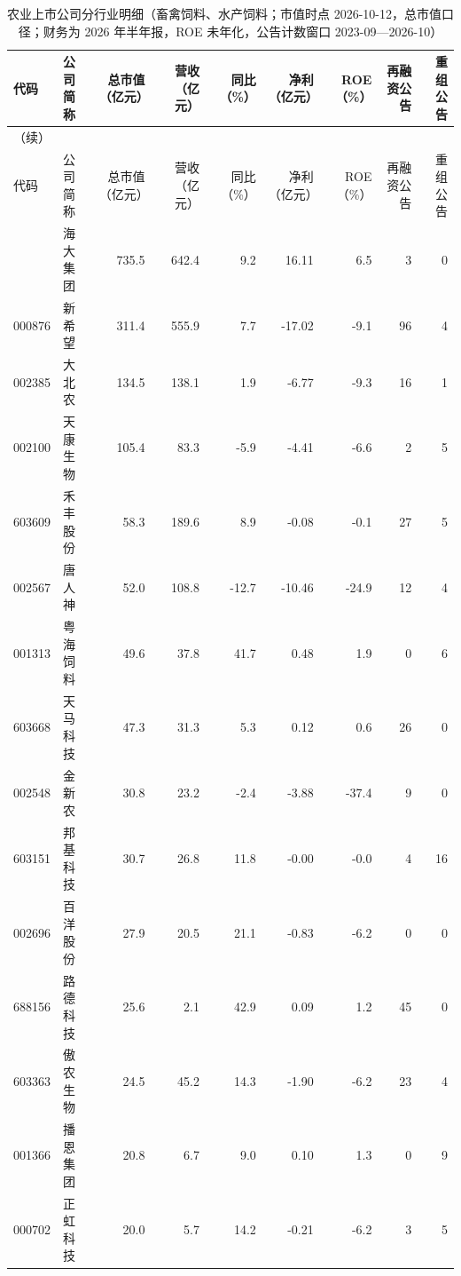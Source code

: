 \begingroup\scriptsize\setlength{\tabcolsep}{2pt}
\begin{longtable}{@{}llrrrrrrr@{}}
\caption{农业上市公司分行业明细（畜禽饲料、水产饲料；市值时点 2026-10-12，总市值口径；财务为 2026 年半年报，ROE 未年化，公告计数窗口 2023-09---2026-10）}\label{tab:comp-feed}\\
\toprule
代码 & 公司简称 & 总市值（亿元） & 营收（亿元） & 同比（\%） & 净利（亿元） & ROE（\%） & 再融资公告 & 重组公告 \\
\midrule
\endfirsthead
\multicolumn{9}{l}{\small（续）}\\
\toprule
代码 & 公司简称 & 总市值（亿元） & 营收（亿元） & 同比（\%） & 净利（亿元） & ROE（\%） & 再融资公告 & 重组公告 \\
\midrule
\endhead
\bottomrule
\endlastfoot
002311 & 海大集团 & 735.5 & 642.4 & 9.2 & 16.11 & 6.5 & 3 & 0 \\
000876 & 新希望 & 311.4 & 555.9 & 7.7 & -17.02 & -9.1 & 96 & 4 \\
002385 & 大北农 & 134.5 & 138.1 & 1.9 & -6.77 & -9.3 & 16 & 1 \\
002100 & 天康生物 & 105.4 & 83.3 & -5.9 & -4.41 & -6.6 & 2 & 5 \\
603609 & 禾丰股份 & 58.3 & 189.6 & 8.9 & -0.08 & -0.1 & 27 & 5 \\
002567 & 唐人神 & 52.0 & 108.8 & -12.7 & -10.46 & -24.9 & 12 & 4 \\
001313 & 粤海饲料 & 49.6 & 37.8 & 41.7 & 0.48 & 1.9 & 0 & 6 \\
603668 & 天马科技 & 47.3 & 31.3 & 5.3 & 0.12 & 0.6 & 26 & 0 \\
002548 & 金新农 & 30.8 & 23.2 & -2.4 & -3.88 & -37.4 & 9 & 0 \\
603151 & 邦基科技 & 30.7 & 26.8 & 11.8 & -0.00 & -0.0 & 4 & 16 \\
002696 & 百洋股份 & 27.9 & 20.5 & 21.1 & -0.83 & -6.2 & 0 & 0 \\
688156 & 路德科技 & 25.6 & 2.1 & 42.9 & 0.09 & 1.2 & 45 & 0 \\
603363 & 傲农生物 & 24.5 & 45.2 & 14.3 & -1.90 & -6.2 & 23 & 4 \\
001366 & 播恩集团 & 20.8 & 6.7 & 9.0 & 0.10 & 1.3 & 0 & 9 \\
000702 & 正虹科技 & 20.0 & 5.7 & 14.2 & -0.21 & -6.2 & 3 & 5 \\
\end{longtable}
\endgroup
